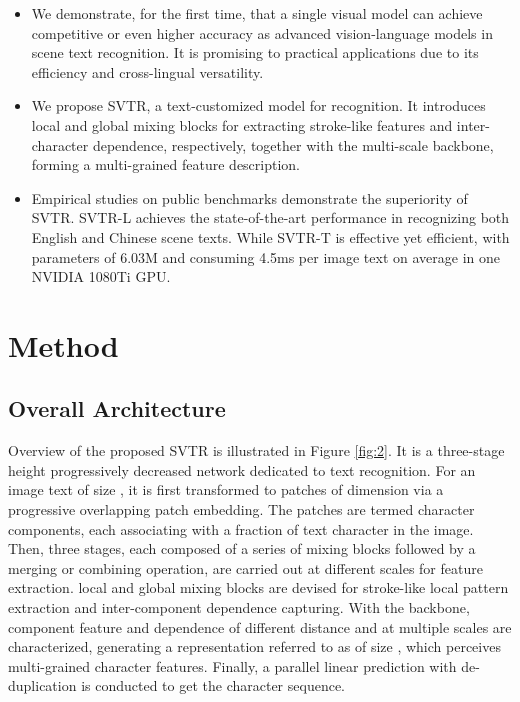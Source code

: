 \documentclass{article}
\begin{document}
\begin{itemize}
\item We demonstrate, for the first time, that a single visual model can achieve competitive or even higher accuracy as advanced vision-language models in scene text recognition. It is promising to practical applications due to its efficiency and cross-lingual versatility.


\item We propose SVTR, a text-customized model for recognition. It introduces local and global mixing blocks for extracting stroke-like features and inter-character dependence, respectively, together with the multi-scale backbone, forming a multi-grained feature description.

\item Empirical studies on public benchmarks demonstrate the superiority of SVTR. SVTR-L achieves the state-of-the-art performance in recognizing both English and Chinese scene texts. While SVTR-T is effective yet efficient, with parameters of 6.03M and consuming 4.5ms per image text on average in one NVIDIA 1080Ti GPU.
\end{itemize}


\section{Method}

\subsection{Overall Architecture}
Overview of the proposed SVTR is illustrated in Figure \ref{fig:2}. It is a three-stage height progressively decreased network dedicated to text recognition. For an image text of size , it is first transformed to  patches of dimension  via a progressive overlapping patch embedding. The patches are termed character components, each associating with a fraction of text character in the image. Then, three stages, each composed of a series of mixing blocks followed by a merging or combining operation, are carried out at different scales for feature extraction. local and global mixing blocks are devised for stroke-like local pattern extraction and inter-component dependence capturing. With the backbone, component feature and dependence of different distance and at multiple scales are characterized, generating a representation referred to as  of size , which perceives multi-grained character features. Finally, a parallel linear prediction with de-duplication is conducted to get the character sequence.
\end{document}

